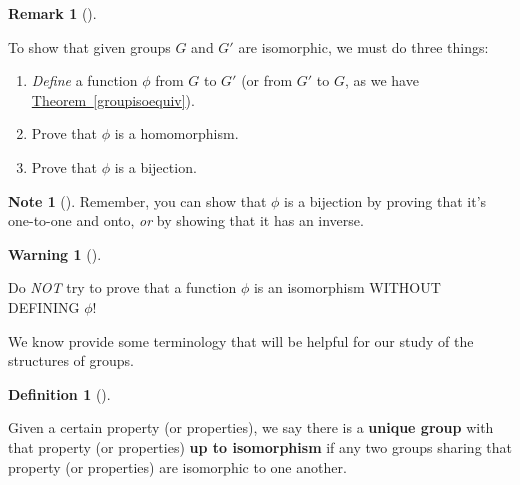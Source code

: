 \documentclass[10pt,]{book}
\newcommand{\terminology}[1]{\textbf{#1}}
\theoremstyle{plain}
\theoremstyle{definition}
\newtheorem{definition}[theorem]{Definition}
\theoremstyle{definition}
\newtheorem{remark}[theorem]{Remark}
\newtheorem{note}[theorem]{Note}
\newtheorem{warning}[theorem]{Warning}
\theoremstyle{definition}
\theoremstyle{definition}
\numberwithin{equation}{section}
\begin{document}
\begin{remark}[]\label{remark-18}

To show that given groups \(G\) and \(G'\) are isomorphic, we must do three things:

\leavevmode%
\begin{enumerate}
\item\hypertarget{li-144}{} \emph{Define} a function \(\phi\) from \(G\) to \(G'\) (or from \(G'\) to \(G\), as we have \hyperref[groupisoequiv]{Theorem~\ref{groupisoequiv}}).%
\item\hypertarget{li-145}{}Prove that \(\phi\) is a homomorphism.%
\item\hypertarget{li-146}{}Prove that \(\phi\) is a bijection.%
\end{enumerate}
%
\end{remark}
\begin{note}[]\label{note-8}
Remember, you can show that \(\phi\) is a bijection by proving that it's one-to-one and onto, \emph{or} by showing that it has an inverse.%
\end{note}
\begin{warning}[]\label{warning-13}

      Do \emph{NOT} try to prove that a function \(\phi\) is an isomorphism WITHOUT DEFINING \(\phi\)!
\end{warning}
\par

    We know provide some terminology that will be helpful for our study of the structures of groups.
\begin{definition}[{}]\label{definition-32}

        Given a certain property (or properties), we say there
        is a \terminology{unique group} with that property (or properties) \terminology{up to isomorphism} if any two groups sharing that property (or
        properties) are isomorphic to one another.
\end{definition}
\par
\end{document}
